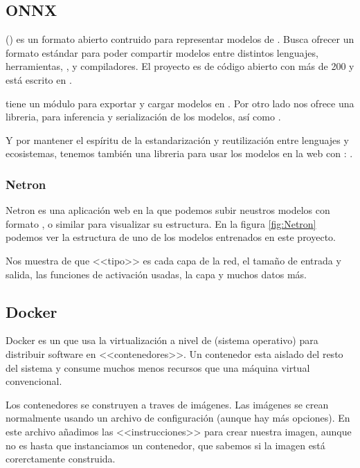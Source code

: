 \subsection{ONNX}\label{tool:ONNX}

 () es un formato abierto contruido para representar modelos de . Busca ofrecer un formato estándar para poder compartir modelos entre distintos lenguajes, herramientas, ,  y compiladores. El proyecto es de código abierto con más de 200  y está escrito en .


 tiene un módulo para exportar y cargar modelos en . Por otro lado  nos ofrece una libreria,  para inferencia y serialización de los modelos, así como .

Y por mantener el espíritu de la estandarización y reutilización entre lenguajes y ecosistemas, tenemos también una libreria para usar los modelos en la web con : .

\subsubsection{Netron}

Netron es una aplicación web en la que podemos subir neustros modelos con formato ,  o similar para visualizar su estructura. En la figura \ref{fig:Netron} podemos ver la estructura de uno de los modelos entrenados en este proyecto.


Nos muestra de que <<tipo>> es cada capa de la red, el tamaño de entrada y salida, las funciones de activación usadas, la capa  y muchos datos más.

\subsection{Docker}

Docker es un  que usa la virtualización a nivel de  (sistema operativo) para distribuir software en <<contenedores>>. Un contenedor esta aislado del resto del sistema y consume muchos menos recursos que una máquina virtual convencional.

Los contenedores se construyen a traves de imágenes. Las imágenes se crean normalmente usando un archivo de configuración  (aunque hay más opciones). En este archivo añadimos las <<instrucciones>> para crear nuestra imagen, aunque no es hasta que instanciamos un contenedor, que sabemos si la imagen está corerctamente construida.

